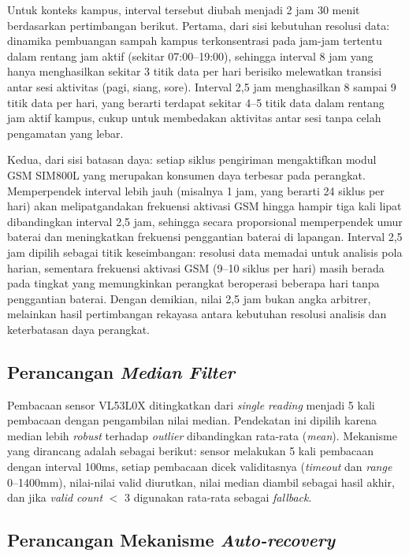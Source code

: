 Untuk konteks kampus, interval tersebut diubah menjadi 2 jam 30 menit berdasarkan pertimbangan berikut. Pertama, dari sisi kebutuhan resolusi data: dinamika pembuangan sampah kampus terkonsentrasi pada jam-jam tertentu dalam rentang jam aktif (sekitar 07:00--19:00), sehingga interval 8 jam yang hanya menghasilkan sekitar 3 titik data per hari berisiko melewatkan transisi antar sesi aktivitas (pagi, siang, sore). Interval 2,5 jam menghasilkan 8 sampai 9 titik data per hari, yang berarti terdapat sekitar 4--5 titik data dalam rentang jam aktif kampus, cukup untuk membedakan aktivitas antar sesi tanpa celah pengamatan yang lebar.

Kedua, dari sisi batasan daya: setiap siklus pengiriman mengaktifkan modul GSM SIM800L yang merupakan konsumen daya terbesar pada perangkat. Memperpendek interval lebih jauh (misalnya 1 jam, yang berarti 24 siklus per hari) akan melipatgandakan frekuensi aktivasi GSM hingga hampir tiga kali lipat dibandingkan interval 2,5 jam, sehingga secara proporsional memperpendek umur baterai dan meningkatkan frekuensi penggantian baterai di lapangan. Interval 2,5 jam dipilih sebagai titik keseimbangan: resolusi data memadai untuk analisis pola harian, sementara frekuensi aktivasi GSM (9--10 siklus per hari) masih berada pada tingkat yang memungkinkan perangkat beroperasi beberapa hari tanpa penggantian baterai. Dengan demikian, nilai 2,5 jam bukan angka arbitrer, melainkan hasil pertimbangan rekayasa antara kebutuhan resolusi analisis dan keterbatasan daya perangkat.

\subsection{Perancangan \textit{Median Filter}}

Pembacaan sensor VL53L0X ditingkatkan dari \textit{single reading} menjadi 5 kali pembacaan dengan pengambilan nilai median. Pendekatan ini dipilih karena median lebih \textit{robust} terhadap \textit{outlier} dibandingkan rata-rata (\textit{mean}). Mekanisme yang dirancang adalah sebagai berikut: sensor melakukan 5 kali pembacaan dengan interval 100ms, setiap pembacaan dicek validitasnya (\textit{timeout} dan \textit{range} 0--1400mm), nilai-nilai valid diurutkan, nilai median diambil sebagai hasil akhir, dan jika \textit{valid count} $<$ 3 digunakan rata-rata sebagai \textit{fallback}.

\subsection{Perancangan Mekanisme \textit{Auto-recovery}}

